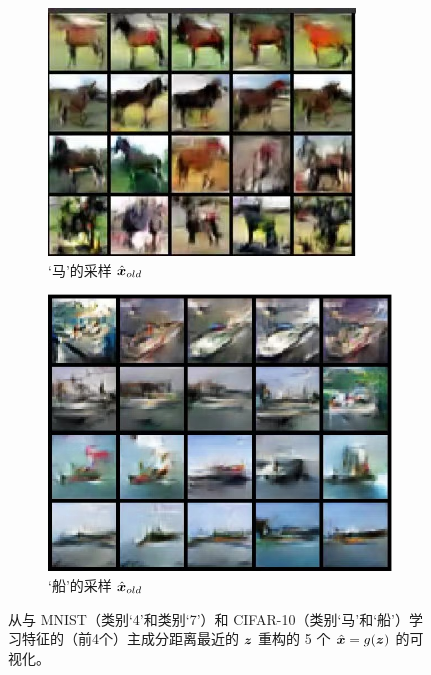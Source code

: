 \documentclass[../../book-main.tex]{subfiles}
\begin{document}
\begin{figure}[t]
    \hfill
    \begin{subfigure}[t]{0.20\textwidth}
        \centering
        \includegraphics[width=\textwidth]{figs_chap6/horse_z.jpg}
        \caption{‘马’的采样 $\hat{\bm{x}}_{old}$}
    \end{subfigure}
    \hfill
    \begin{subfigure}[t]{0.20\textwidth}
        \centering
        \includegraphics[width=\textwidth]{figs_chap6/ship_z.jpg}
        \caption{‘船’的采样 $\hat{\bm{x}}_{old}$}
    \end{subfigure}
    \caption{\small 从与 {MNIST}（类别‘4’和类别‘7’）和 {CIFAR-10}（类别‘马’和‘船’）学习特征的（前4个）主成分距离最近的 $\bm{z}$ 重构的 5 个 $\hat {\bm{x}}=g(\bm{z})$ 的可视化。}
    \label{fig:pca_sampling_main}
\end{figure}
\end{document}
